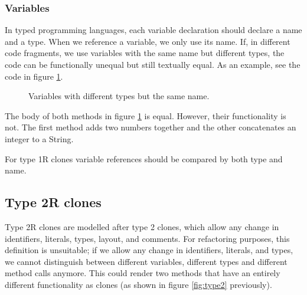 \subsubsection{Variables}
In typed programming languages, each variable declaration should declare a name and a type. When we reference a variable, we only use its name. If, in different code fragments, we use variables with the same name but different types, the code can be functionally unequal but still textually equal. As an example, see the code in figure \ref{fig:type2variables}.

\begin{figure}[H]
\begin{parcolumns}{2}
\end{parcolumns}
\caption{Variables with different types but the same name.}
\label{fig:type2variables}
\end{figure}

The body of both methods in figure \ref{fig:type2variables} is equal. However, their functionality is not. The first method adds two numbers together and the other concatenates an integer to a String.

For type 1R clones variable references should be compared by both type and name.

\subsection{Type 2R clones} \label{sec:type2r}
Type 2R clones are modelled after type 2 clones, which allow any change in identifiers, literals, types, layout, and comments. For refactoring purposes, this definition is unsuitable; if we allow any change in identifiers, literals, and types, we cannot distinguish between different variables, different types and different method calls anymore. This could render two methods that have an entirely different functionality as clones (as shown in figure \ref{fig:type2} previously).

